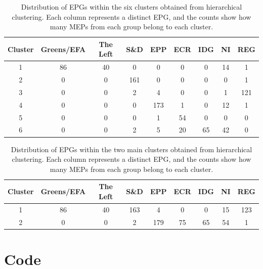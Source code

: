 \documentclass{article}
\begin{document}
\begin{table}[ht]
  \centering
  \begin{tabular}{c|cccccccc}
       \textbf{Cluster} & \textbf{Greens/EFA} & \textbf{The Left} & \textbf{S\&D} & \textbf{EPP} & \textbf{ECR} & \textbf{IDG} & \textbf{NI} & \textbf{REG} \\
       \hline
       1 & 86 & 40 & 0 & 0 & 0 & 0 & 14 & 1 \\
       2 & 0  & 0  & 161 & 0 & 0 & 0 & 0 & 1 \\
       3 & 0  & 0  & 2 & 4 & 0 & 0 & 1 & 121 \\
       4 & 0  & 0  & 0 & 173 & 1 & 0 & 12 & 1 \\
       5 & 0  & 0  & 0 & 1 & 54 & 0 & 0 & 0 \\
       6 & 0  & 0  & 2 & 5 & 20 & 65 & 42 & 0 \\
  \end{tabular}
  \caption{Distribution of EPGs within the six clusters obtained from hierarchical clustering. Each column represents a distinct EPG, and the counts show how many MEPs from each group belong to each cluster.}
  \label{tab:hiercluster}
\end{table}

\begin{table}[ht]
  \centering
  \begin{tabular}{c|cccccccc}
       \textbf{Cluster} & \textbf{Greens/EFA} & \textbf{The Left} & \textbf{S\&D} & \textbf{EPP} & \textbf{ECR} & \textbf{IDG} & \textbf{NI} & \textbf{REG} \\
       \hline
       1 & 86 & 40 & 163 & 4 & 0 & 0 & 15 & 123 \\
       2 & 0  & 0  & 2   & 179 & 75 & 65 & 54 & 1 \\
  \end{tabular}
  \caption{Distribution of EPGs within the two main clusters obtained from hierarchical clustering. Each column represents a distinct EPG, and the counts show how many MEPs from each group belong to each cluster.}
  \label{tab:epg-clusters}
\end{table}



\vfill
\appendix
\section{Code}



\end{document}

